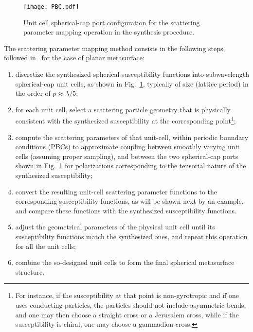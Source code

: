 \documentclass[journal,transaction]{IEEEtran}
\newcommand{\figref}{Fig.~\ref}
\newcommand{\uve}[1]{\mathbf{\hat{#1}}}
\begin{document}
\begin{figure}[!h]
    \centering
         \texttt{[image: PBC.pdf]}{
        }
        \caption{Unit cell spherical-cap port configuration for the scattering parameter mapping operation in the synthesis procedure.}
   \label{FIG:PBC}
\end{figure}

The scattering parameter mapping method consists in the following steps, followed in~\cite{synthesis_planar_KA2015} for the case of planar metasurface:
%
\begin{enumerate}
  \item discretize the synthesized spherical susceptibility functions into subwavelength spherical-cap unit cells, as shown in \figref{FIG:PBC}, typically of size (lattice period) in the order of $p\approx\lambda/5$;
  \item for each unit cell, select a scattering particle geometry that is physically consistent with the synthesized susceptibility at the corresponding point\footnote{For instance, if the susceptibility at that point is non-gyrotropic and if one uses conducting particles, the particles should not include asymmetric bends, and one may then choose a straight cross or a Jerusalem cross, while if the susceptibility is chiral, one may choose a gammadion cross.};
  \item compute the scattering parameters of that unit-cell, within periodic boundary conditions (PBCs) to approximate coupling between smoothly varying unit cells (assuming proper sampling), and between the two spherical-cap ports shown in \figref{FIG:PBC} for polarizations corresponding to the tensorial nature of the synthesized susceptibility;
  \item convert the resulting unit-cell scattering parameter functions to the corresponding susceptibility functions, as will be shown next by an example, and compare these functions with the synthesized susceptibility functions.
  \item adjust the geometrical parameters of the physical unit cell until its susceptibility functions match the synthesized ones, and repeat this operation for all the unit cells;
  \item combine the so-designed unit cells to form the final spherical metasurface structure.
\end{enumerate}
\end{document}
